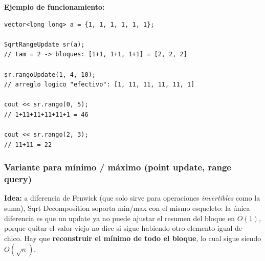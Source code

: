 \documentclass[10pt,a4paper,twocolumn]{article}
\begin{document}
\textbf{Ejemplo de funcionamiento:}

\begin{lstlisting}[style=cpp]
vector<long long> a = {1, 1, 1, 1, 1, 1};

SqrtRangeUpdate sr(a);
// tam = 2 -> bloques: [1+1, 1+1, 1+1] = [2, 2, 2]

sr.rangoUpdate(1, 4, 10);
// arreglo logico "efectivo": [1, 11, 11, 11, 11, 1]

cout << sr.rango(0, 5);
// 1+11+11+11+11+1 = 46

cout << sr.rango(2, 3);
// 11+11 = 22
\end{lstlisting}


\subsubsection{Variante para mínimo / máximo (point update, range query)}

\textbf{Idea:} a diferencia de Fenwick (que solo sirve para
operaciones \emph{invertibles} como la suma), Sqrt Decomposition
soporta min/max con el mismo esqueleto: la única diferencia es que un
update ya no puede ajustar el resumen del bloque en $O(1)$, porque
quitar el valor viejo no dice si sigue habiendo otro elemento igual
de chico. Hay que \textbf{reconstruir el mínimo de todo el bloque},
lo cual sigue siendo $O(\sqrt n)$.
\end{document}
